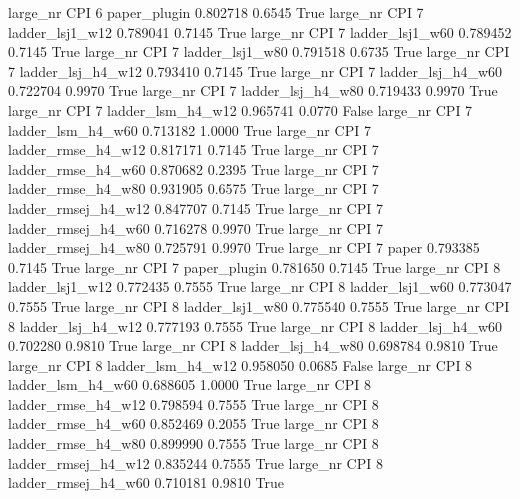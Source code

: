   large_nr      CPI                 6        paper_plugin   0.802718      0.6545    True
  large_nr      CPI                 7     ladder_lsj1_w12   0.789041      0.7145    True
  large_nr      CPI                 7     ladder_lsj1_w60   0.789452      0.7145    True
  large_nr      CPI                 7     ladder_lsj1_w80   0.791518      0.6735    True
  large_nr      CPI                 7   ladder_lsj_h4_w12   0.793410      0.7145    True
  large_nr      CPI                 7   ladder_lsj_h4_w60   0.722704      0.9970    True
  large_nr      CPI                 7   ladder_lsj_h4_w80   0.719433      0.9970    True
  large_nr      CPI                 7   ladder_lsm_h4_w12   0.965741      0.0770   False
  large_nr      CPI                 7   ladder_lsm_h4_w60   0.713182      1.0000    True
  large_nr      CPI                 7  ladder_rmse_h4_w12   0.817171      0.7145    True
  large_nr      CPI                 7  ladder_rmse_h4_w60   0.870682      0.2395    True
  large_nr      CPI                 7  ladder_rmse_h4_w80   0.931905      0.6575    True
  large_nr      CPI                 7 ladder_rmsej_h4_w12   0.847707      0.7145    True
  large_nr      CPI                 7 ladder_rmsej_h4_w60   0.716278      0.9970    True
  large_nr      CPI                 7 ladder_rmsej_h4_w80   0.725791      0.9970    True
  large_nr      CPI                 7               paper   0.793385      0.7145    True
  large_nr      CPI                 7        paper_plugin   0.781650      0.7145    True
  large_nr      CPI                 8     ladder_lsj1_w12   0.772435      0.7555    True
  large_nr      CPI                 8     ladder_lsj1_w60   0.773047      0.7555    True
  large_nr      CPI                 8     ladder_lsj1_w80   0.775540      0.7555    True
  large_nr      CPI                 8   ladder_lsj_h4_w12   0.777193      0.7555    True
  large_nr      CPI                 8   ladder_lsj_h4_w60   0.702280      0.9810    True
  large_nr      CPI                 8   ladder_lsj_h4_w80   0.698784      0.9810    True
  large_nr      CPI                 8   ladder_lsm_h4_w12   0.958050      0.0685   False
  large_nr      CPI                 8   ladder_lsm_h4_w60   0.688605      1.0000    True
  large_nr      CPI                 8  ladder_rmse_h4_w12   0.798594      0.7555    True
  large_nr      CPI                 8  ladder_rmse_h4_w60   0.852469      0.2055    True
  large_nr      CPI                 8  ladder_rmse_h4_w80   0.899990      0.7555    True
  large_nr      CPI                 8 ladder_rmsej_h4_w12   0.835244      0.7555    True
  large_nr      CPI                 8 ladder_rmsej_h4_w60   0.710181      0.9810    True
